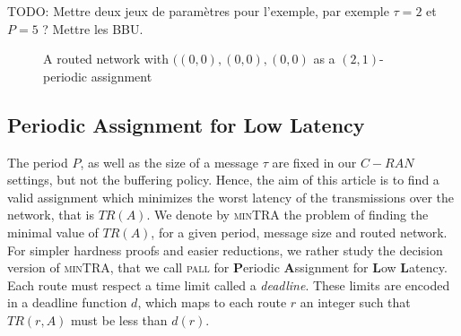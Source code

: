 \documentclass[a4paper,10pt]{article}
\newcommand{\todo}[1]{{\color{red} TODO: {#1}}}
\newcommand\pall{\textsc{pall}\xspace}
\newcommand\mintra{\textsc{minTRA}\xspace}
\begin{document}
\todo{Mettre deux jeux de paramètres pour l'exemple, par exemple $\tau = 2$ et $P = 5$ ? Mettre les BBU.}

  
\begin{figure}[ht]
    \begin{center}
  	\end{center}
    \caption{A routed network with $((0,0),(0,0),(0,0)$ as a $(2,1)$-periodic assignment}
    \label{fig:example}
\end{figure}



	\subsection{Periodic Assignment for Low Latency}

      	The period $P$, as well as the size of a message $\tau$ are fixed in our $C-RAN$ settings, but not the buffering policy. Hence, the aim of this article is to find a valid assignment which minimizes the worst latency of the transmissions over the network, that is $TR(A)$. We denote by \mintra the problem of finding the minimal value of $TR(A)$, for a given period, message size and routed network.
      	For simpler hardness proofs and easier reductions, we rather study the decision version of \mintra, that we call \pall for \textbf{P}eriodic \textbf{A}ssignment for \textbf{L}ow \textbf{L}atency. Each route must respect a time limit called a \emph{deadline}. These limits are encoded in a deadline function $d$, which maps to each route $r$ an integer such that $TR(r,A)$ must be less than $d(r)$.
       
\end{document}
